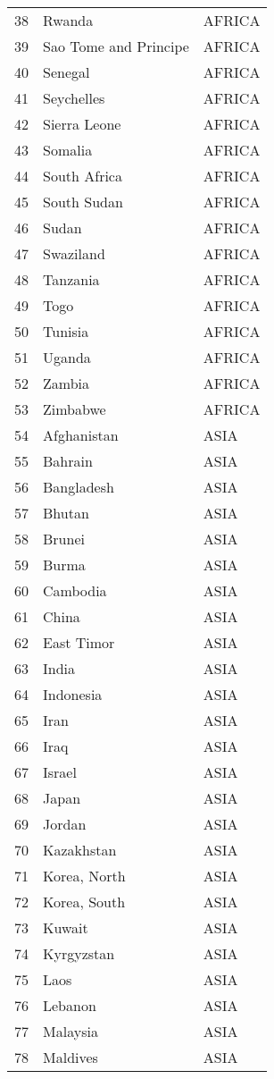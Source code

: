 \documentclass[11pt]{article}
\begin{document}
\begin{center}
\begin{tabular}{rll}
38 & Rwanda & AFRICA\\
39 & Sao Tome and Principe & AFRICA\\
40 & Senegal & AFRICA\\
41 & Seychelles & AFRICA\\
42 & Sierra Leone & AFRICA\\
43 & Somalia & AFRICA\\
44 & South Africa & AFRICA\\
45 & South Sudan & AFRICA\\
46 & Sudan & AFRICA\\
47 & Swaziland & AFRICA\\
48 & Tanzania & AFRICA\\
49 & Togo & AFRICA\\
50 & Tunisia & AFRICA\\
51 & Uganda & AFRICA\\
52 & Zambia & AFRICA\\
53 & Zimbabwe & AFRICA\\
54 & Afghanistan & ASIA\\
55 & Bahrain & ASIA\\
56 & Bangladesh & ASIA\\
57 & Bhutan & ASIA\\
58 & Brunei & ASIA\\
59 & Burma & ASIA\\
60 & Cambodia & ASIA\\
61 & China & ASIA\\
62 & East Timor & ASIA\\
63 & India & ASIA\\
64 & Indonesia & ASIA\\
65 & Iran & ASIA\\
66 & Iraq & ASIA\\
67 & Israel & ASIA\\
68 & Japan & ASIA\\
69 & Jordan & ASIA\\
70 & Kazakhstan & ASIA\\
71 & Korea, North & ASIA\\
72 & Korea, South & ASIA\\
73 & Kuwait & ASIA\\
74 & Kyrgyzstan & ASIA\\
75 & Laos & ASIA\\
76 & Lebanon & ASIA\\
77 & Malaysia & ASIA\\
78 & Maldives & ASIA\\

\end{tabular}
\end{center}
\end{document}
